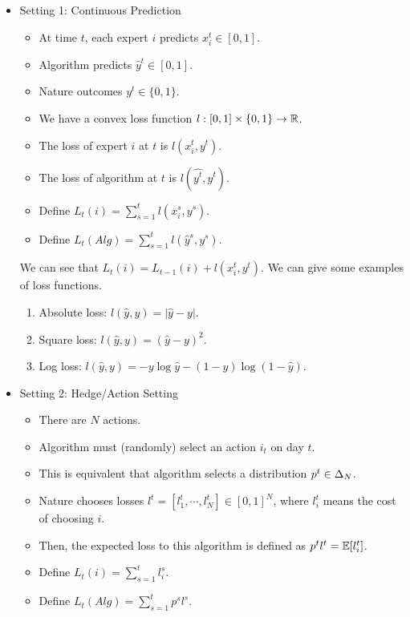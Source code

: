\documentclass[../main.tex]{subfiles}
\begin{document}
\begin{itemize}
	\item Setting 1: Continuous Prediction
	\begin{itemize}
		\item At time $t$, each expert $i$ predicts $x_i^t \in [0,1]$.
		\item Algorithm predicts $\hat{y}^t \in [0,1]$.
		\item Nature outcomes $y^t \in \{0,1\}$.
		\item We have a convex loss function $l:[0,1] \times \{0,1\} \to \mathbb{R}$.
		\item The loss of expert $i$ at $t$ is $l(x_i^t, y^t)$.
		\item The loss of algorithm at $t$ is $l(\hat{y^t}, y^t)$.
		\item Define $L_t(i) = \sum\limits_{s = 1}^t l(x_i^s, y^s)$.
		\item Define $L_t(Alg) =\sum\limits_{s = 1}^t l(\hat{y}^s, y^s) $.
	\end{itemize}
	
	We can see that $L_t(i) = L_{t-1}(i) + l(x_i^t, y^t)$. We can give some examples of loss functions.
	\begin{enumerate}
		\item Absolute loss: $l(\hat{y} ,y) = |\hat{y} - y|$.
		\item Square loss: $l(\hat{y} ,y) = (\hat{y} - y)^2$.
		\item Log loss: $l(\hat{y}, y) = -y \log \hat{y} - (1-y) \log(1-\hat{y})$.
	\end{enumerate}
	\item Setting 2: Hedge/Action Setting
	
	\begin{itemize}
	\item There are $N$ actions.
	\item Algorithm must (randomly) select an action $i_t$ on day $t$.
	\item This is equivalent that algorithm selects a distribution $p^t \in \Delta_N$.
	\item Nature chooses losses $l^t = [l_1^t,\cdots, l_N^t] \in [0,1]^N$, where $l_i^t$ means the cost of choosing $i$.
	\item Then, the expected loss to this algorithm is defined as $p^t l^t = \mathbb{E}[l_i^t]$.
	\item Define $L_t(i) = \sum\limits_{s = 1}^t l_i^s$.
	\item Define $L_t(Alg) =\sum\limits_{s = 1}^t p^s l^s $.
	\end{itemize}
\end{itemize}
\end{document}
